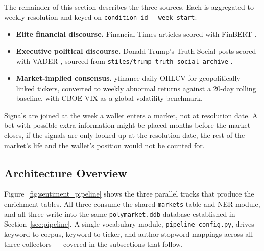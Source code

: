 \documentclass[11pt]{article}
\begin{document}
The remainder of this section describes the three sources. Each is
aggregated to weekly resolution and keyed on \texttt{condition\_id}
+ \texttt{week\_start}:

\begin{itemize}
    \item \textbf{Elite financial discourse.} Financial Times
          articles scored with FinBERT \cite{araci2019finbert}.
    \item \textbf{Executive political discourse.} Donald Trump's
          Truth Social posts scored with VADER \cite{hutto2014vader},
          sourced from
          \texttt{stiles/trump-truth-social-archive}
          \cite{trump_archive}.
    \item \textbf{Market-implied consensus.} yfinance daily OHLCV
          for geopolitically-linked tickers, converted to weekly
          abnormal returns against a 20-day rolling baseline, with
          CBOE VIX as a global volatility benchmark.
\end{itemize}

\noindent Signals are joined at the week a wallet enters a
market, not at resolution date. 
A bet with possible extra information might be placed months
before the market closes, if the signals are only looked up at the 
resolution date, the rest of the market's life and the wallet's position would not be counted for. 

\subsection{Architecture Overview}
\label{sec:sentiment_architecture}

Figure~\ref{fig:sentiment_pipeline} shows the three parallel tracks
that produce the enrichment tables. All three consume the shared
\texttt{markets} table and NER module, and all three write into the
same \texttt{polymarket.ddb} database established in
Section~\ref{sec:pipeline}. A single vocabulary module,
\texttt{pipeline\_config.py}, drives keyword-to-corpus, keyword-to-ticker,
and author-stopword mappings across all three collectors — covered
in the subsections that follow.
\end{document}
